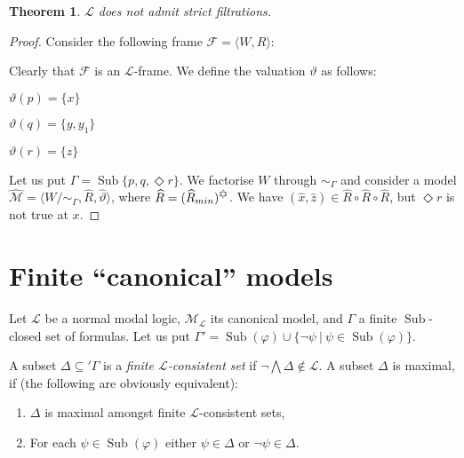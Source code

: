 \documentclass[a4paper]{article}
\theoremstyle{defin}
\theoremstyle{theorem}
\newtheorem{theorem}{Theorem}
\theoremstyle{prop}
\theoremstyle{lemma}
\theoremstyle{fact}
\theoremstyle{ex}
\theoremstyle{col}
\theoremstyle{claim}
\begin{document}
\begin{theorem}
  $\mathcal{L}$ does not admit strict filtrations.
\end{theorem}

\begin{proof}
  Consider the following frame $\mathcal{F} = \langle W, R \rangle$:

\vspace{\baselineskip}


\vspace{\baselineskip}

  Clearly that $\mathcal{F}$ is an $\mathcal{L}$-frame. We define the valuation $\vartheta$ as follows:

  \begin{center}
    $\vartheta(p) = \{ x \}$

    $\vartheta(q) = \{ y, y_1 \}$

    $\vartheta(r) = \{ z \}$
  \end{center}
  Let us put $\Gamma = \operatorname{Sub} \{ p, q, \Diamond r \}$. We factorise $W$ through $\sim_{\Gamma}$ and consider a model $\widehat{\mathcal{M}} = \langle W / \sim_{\Gamma}, \widehat{R}, \widehat{\vartheta} \rangle$, where $\widehat{R} = (\widehat{R}_{min})^{\davidsstar}$.
  We have $(\hat{x}, \hat{z}) \in \widehat{R} \circ \widehat{R} \circ \widehat{R}$, but $\Diamond r$ is not true at $x$.
\end{proof}

\section{Finite ``canonical'' models}

Let $\mathcal{L}$ be a normal modal logic, $\mathcal{M}_{\mathcal{L}}$ its canonical model, and $\Gamma$ a finite $\operatorname{Sub}$-closed set of formulas. Let us put $\Gamma' = \operatorname{Sub}(\varphi) \cup \{ \neg \psi \: | \: \psi \in \operatorname{Sub}(\varphi) \}$.

A subset $\Delta \subseteq '\Gamma$ is a \emph{finite $\mathcal{L}$-consistent set} if $\neg \bigwedge \Delta \notin \mathcal{L}$. A subset $\Delta$ is maximal, if (the following are obviously equivalent):
\begin{enumerate}
  \item $\Delta$ is maximal amongst finite $\mathcal{L}$-consistent sets,
  \item For each $\psi \in \operatorname{Sub}(\varphi)$ either $\psi \in \Delta$ or
  $\neg \psi \in \Delta$.
\end{enumerate}
\end{document}
